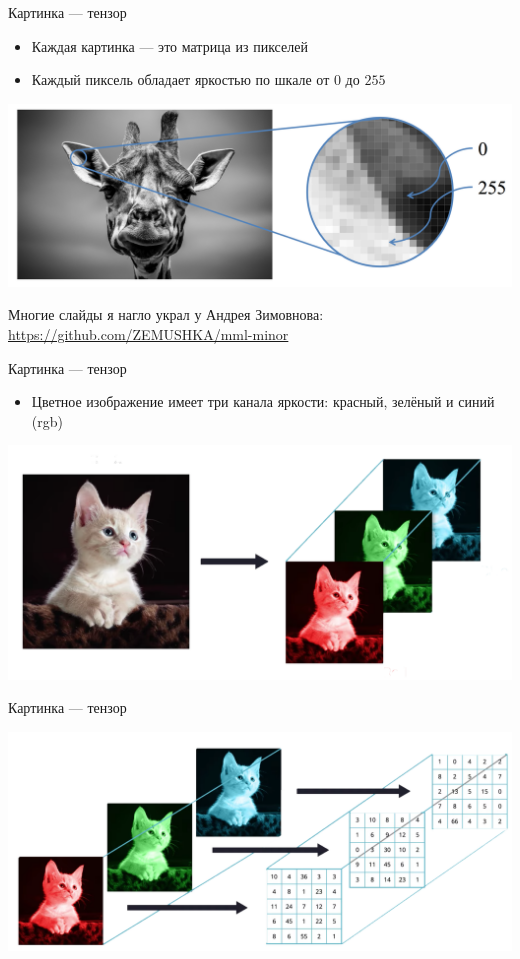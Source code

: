 \documentclass[notes,12pt, aspectratio=169]{beamer}
\begin{document}
\begin{frame}{Картинка — тензор}
\begin{itemize}
	\item Каждая картинка — это матрица из пикселей
	
	\item Каждый пиксель обладает яркостью по шкале от $0$ до $255$ 
	
\end{itemize}
\begin{center}
	\includegraphics[width=.8\linewidth]{pixels.png}
\end{center}

\vfill %
\footnotesize
Многие слайды я нагло украл у Андрея Зимовнова: {\color{blue} \url{ https://github.com/ZEMUSHKA/mml-minor}}
\end{frame}

\begin{frame}{Картинка — тензор}
\begin{itemize}
	\item Цветное изображение имеет три канала яркости: красный, зелёный и синий (rgb)
\end{itemize}

\begin{center}
\includegraphics[width=.7\linewidth]{pixels2_clean.png}
\end{center}
\end{frame}

\begin{frame}{Картинка — тензор}
\begin{center}
	\includegraphics[width=.8\linewidth]{pixels3_clean.png}
\end{center}
\end{frame}
\end{document}
